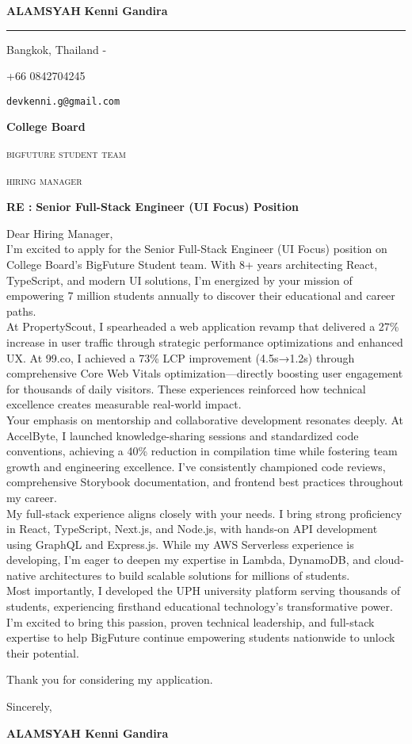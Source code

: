 \documentclass[12pt]{article}
\newcommand{\firstname}{Kenni Gandira}
\newcommand{\lastname}{Alamsyah}
\newcommand{\mainColor}{redBlood} %
\newlength{\spacebox}
\newcommand{\shspace}{\hspace*{0.8em}}
\newcommand{\xvspace}{\vspace*{0.1em}}
\newcommand{\svspace}{\vspace*{0.5em}}
\newcommand{\mvspace}{\vspace*{1.5em}}
\newcommand{\hvspace}{\vspace*{2.5em}}
\newcommand{\negmvspace}{\vspace*{-1em}}
\newcommand{\userInfo}[4]{
    \begin{flushleft}
        \color{\mainColor}
        \Huge
        \textbf{\MakeUppercase{\lastname}}
        \color{black}
        \textbf{\firstname}
        \color{\mainColor}
        \noindent\rule{19.1cm}{0.8pt}
        \color{grayShy}
        \small
        \par
        \parbox{7\spacebox} {
            \faMap \shspace #1 - #2 \par \svspace
            \faPhone \shspace #3 \par \svspace
            \faEnvelopeOpen \shspace \texttt{#4} \par \svspace
        }
        \color{\mainColor}
        \mvspace
    \end{flushleft}
    \negmvspace
}
\newcommand{\companyInfo}[4]{
    \begin{flushright}
        \parbox{4\spacebox}{
            \raggedleft
            \small
            \textbf{#1}\par
            \mvspace
            \color{grayShy} \textsc{\MakeLowercase{#2}}\par
            \xvspace
            \textsc{\MakeLowercase{#3}}\par
            \xvspace
            \textsc{\MakeLowercase{#4}}\par
            \color{black}
        }
    \end{flushright}
    \hvspace
}
\newcommand{\object}[1]{
    \small
    \color{\mainColor} \textbf{RE :} \color{black} \textbf{#1} \par
}
\newcommand{\content}[2]{
    \mvspace
    \begin{flushleft}
        \parbox{10.3\spacebox}{
          #1\par
          \svspace
          #2
        }\par
    \end{flushleft}
}
\newcommand{\signature}{
    \svspace
    \parbox{3\spacebox}{
      Sincerely,\par
      \svspace \hspace{-0.3em}
      \textbf{\color{\mainColor} \MakeUppercase{\lastname} \color{black} \firstname}\par
      \svspace \svspace
      \Huge \faPenNib\par
    }\par
}
\begin{document}
\selectfont
\userInfo{Bangkok, Thailand}{}{+66 0842704245}{devkenni.g@gmail.com}
\companyInfo{College Board}{BigFuture Student Team}{Hiring Manager}{}
\object{Senior Full-Stack Engineer (UI Focus) Position}
\content{
  Dear Hiring Manager, \\

  I'm excited to apply for the Senior Full-Stack Engineer (UI Focus) position on College Board's BigFuture Student team. With 8+ years architecting React, TypeScript, and modern UI solutions, I'm energized by your mission of empowering 7 million students annually to discover their educational and career paths. \\

  At PropertyScout, I spearheaded a web application revamp that delivered a 27\% increase in user traffic through strategic performance optimizations and enhanced UX. At 99.co, I achieved a 73\% LCP improvement (4.5s→1.2s) through comprehensive Core Web Vitals optimization—directly boosting user engagement for thousands of daily visitors. These experiences reinforced how technical excellence creates measurable real-world impact. \\

  Your emphasis on mentorship and collaborative development resonates deeply. At AccelByte, I launched knowledge-sharing sessions and standardized code conventions, achieving a 40\% reduction in compilation time while fostering team growth and engineering excellence. I've consistently championed code reviews, comprehensive Storybook documentation, and frontend best practices throughout my career. \\

  My full-stack experience aligns closely with your needs. I bring strong proficiency in React, TypeScript, Next.js, and Node.js, with hands-on API development using GraphQL and Express.js. While my AWS Serverless experience is developing, I'm eager to deepen my expertise in Lambda, DynamoDB, and cloud-native architectures to build scalable solutions for millions of students. \\

  Most importantly, I developed the UPH university platform serving thousands of students, experiencing firsthand educational technology's transformative power. I'm excited to bring this passion, proven technical leadership, and full-stack expertise to help BigFuture continue empowering students nationwide to unlock their potential.\\
}{Thank you for considering my application.}
\signature
\end{document}
